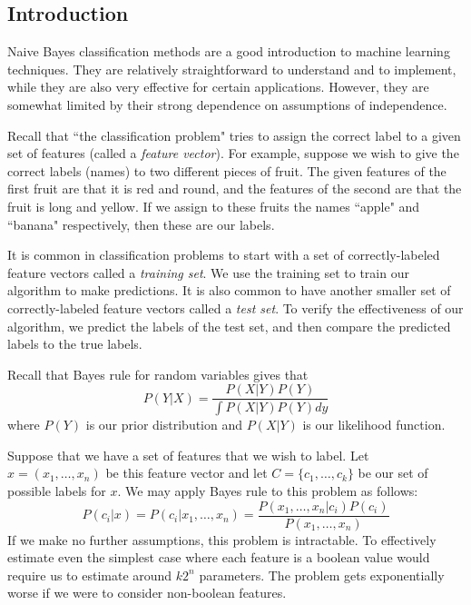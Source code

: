 \label{Ch:NaiveBayes}



%
%	
%	
%	
%

\subsection*{Introduction}

Naive Bayes classification methods are a good introduction to machine learning techniques.
They are relatively straightforward to understand and to implement, while they are also very effective for certain applications.
However, they are somewhat limited by their strong dependence on assumptions of independence.

Recall that ``the classification problem" tries to assign the correct label to a given set of features
(called a \emph{feature vector}).
For example, suppose we wish to give the correct labels (names) to two different pieces of fruit.
The given features of the first fruit are that it is red and round, and the features of the second are that the fruit is long and yellow.
If we assign to these fruits the names ``apple" and ``banana" respectively, then these are our labels.

It is common in classification problems to start with a set of correctly-labeled feature vectors called a \emph{training set}.
We use the training set to train our algorithm to make predictions.
It is also common to have another smaller set of correctly-labeled feature vectors called a \emph{test set}.
To verify the effectiveness of our algorithm, we predict the labels of the test set, and then compare the predicted labels to the true labels.

Recall that Bayes rule for random variables gives that
\[
P(Y|X) = \frac{P(X|Y)P(Y)}{\int P(X|Y)P(Y) dy}
\]
where $P(Y)$ is our prior distribution and $P(X|Y)$ is our likelihood function.

Suppose that we have a set of features that we wish to label.
Let $x = (x_1, \ldots, x_n)$ be this feature vector and let $C = \{c_1, \ldots, c_k\}$ be our set of possible labels for $x$.
We may apply Bayes rule to this problem as follows:
\[
P(c_i|x) = P(c_i | x_1, \ldots, x_n)  = \frac{P(x_1, \ldots, x_n|c_i)P(c_i)}{P(x_1, \ldots, x_n)}
\]
If we make no further assumptions, this problem is intractable.
To effectively estimate even the simplest case where each feature is a boolean value would require us to estimate around $k2^{n}$ parameters.
The problem gets exponentially worse if we were to consider non-boolean features.

